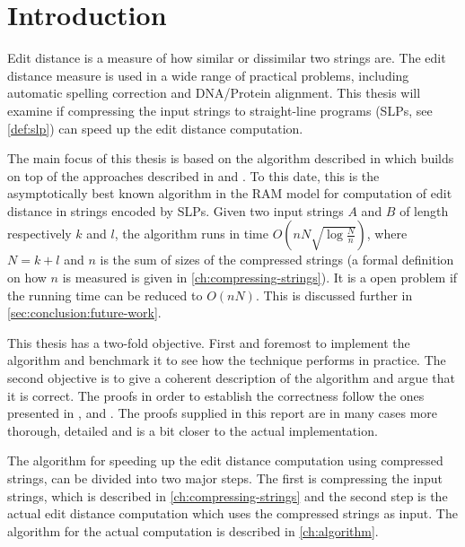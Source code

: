 \documentclass[twoside,11pt,openright]{report}
\begin{document}

\chapter{Introduction}
\label{ch:intro}
Edit distance is a measure of how similar or dissimilar two strings are. The edit distance measure is used in a wide range of practical problems, including automatic spelling correction and DNA/Protein alignment. This thesis will examine if compressing the input strings to straight-line programs (SLPs, see \cref{def:slp}) can speed up the edit distance computation.

The main focus of this thesis is based on the algorithm described in \cite{Gawrychowski:2012:FAC:2422024.2422048} which builds on top of the approaches described in \cite{DBLP:journals/corr/abs-1004-1194} and \cite{DBLP:journals/corr/abs-0707-3619}. To this date, this is the asymptotically best known algorithm in the RAM model for computation of edit distance in strings encoded by SLPs. Given two input strings $A$ and $B$ of length respectively $k$ and $l$, the algorithm runs in time $O(n N \sqrt{\log{\frac{N}{n}}})$, where $N = k + l$ and $n$ is the sum of sizes of the compressed strings (a formal definition on how $n$ is measured is given in \cref{ch:compressing-strings}). It is a open problem if the running time can be reduced to $O(nN)$. This is discussed further in \cref{sec:conclusion:future-work}.

This thesis has a two-fold objective. First and foremost to implement the algorithm and benchmark it to see how the technique performs in practice. The second objective is to give a coherent description of the algorithm and argue that it is correct. The proofs in order to establish the correctness follow the ones presented in \cite{DBLP:journals/corr/abs-0707-3619}, \cite{Gawrychowski:2012:FAC:2422024.2422048} and \cite{Tiskin:2010:FDM:1873601.1873704}. The proofs supplied in this report are in many cases more thorough, detailed and is a bit closer to the actual implementation.

The algorithm for speeding up the edit distance computation using compressed strings, can be divided into two major steps. The first is compressing the input strings, which is described in \cref{ch:compressing-strings} and the second step is the actual edit distance computation which uses the compressed strings as input. The algorithm for the actual computation is described in \cref{ch:algorithm}.
\end{document}
